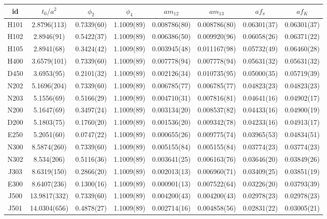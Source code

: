 \begin{sidewaystable}
\begin{center}
    \begin{tabular}{c c c c c c c c}
id & $t_0/a^2$ & $\phi_2$ & $\phi_4$ & $am_{12}$ & $am_{13}$ & $af_{\pi}$ & $af_K$ \\
\toprule
H101 & 2.8796(113) & 0.7339(60) & 1.1009(89) & 0.008786(80) & 0.008786(80) & 0.06301(37) & 0.06301(37) \\
H102 & 2.8946(91) & 0.5422(37) & 1.1009(89) & 0.006386(50) & 0.009920(96) & 0.06058(26) & 0.06371(22) \\
H105 & 2.8941(68) & 0.3424(42) & 1.1009(89) & 0.003945(48) & 0.011167(98) & 0.05732(49) & 0.06460(28) \\
\midrule
H400 & 3.6579(101) & 0.7339(60) & 1.1009(89) & 0.007778(94) & 0.007778(94) & 0.05631(32) & 0.05631(32) \\
D450 & 3.6953(95) & 0.2101(32) & 1.1009(89) & 0.002126(34) & 0.010735(95) & 0.05000(35) & 0.05719(39) \\
\midrule
N202 & 5.1696(204) & 0.7339(60) & 1.1009(89) & 0.006785(77) & 0.006785(77) & 0.04823(23) & 0.04823(23) \\
N203 & 5.1556(69) & 0.5166(29) & 1.1009(89) & 0.004710(31) & 0.007816(81) & 0.04641(16) & 0.04902(17) \\
N200 & 5.1647(69) & 0.3497(24) & 1.1009(89) & 0.003134(20) & 0.008537(82) & 0.04433(16) & 0.04900(19) \\
D200 & 5.1803(75) & 0.1760(20) & 1.1009(89) & 0.001536(20) & 0.009342(78) & 0.04233(16) & 0.04913(17) \\
E250 & 5.2051(60) & 0.0747(22) & 1.1009(89) & 0.000655(26) & 0.009775(74) & 0.03965(53) & 0.04834(51) \\
\midrule
N300 & 8.5874(260) & 0.7339(60) & 1.1009(89) & 0.005155(84) & 0.005155(84) & 0.03774(23) & 0.03774(23) \\
N302 & 8.534(206) & 0.5116(36) & 1.1009(89) & 0.003641(25) & 0.006163(76) & 0.03646(20) & 0.03849(26) \\
J303 & 8.6319(150) & 0.2866(20) & 1.1009(89) & 0.002013(13) & 0.006960(71) & 0.03409(25) & 0.03851(19) \\
E300 & 8.6407(236) & 0.1300(16) & 1.1009(89) & 0.000901(13) & 0.007522(64) & 0.03226(20) & 0.03793(39) \\
\midrule
J500 & 13.9817(332) & 0.7339(60) & 1.1009(89) & 0.004200(43) & 0.004200(43) & 0.02978(23) & 0.02978(23) \\
J501 & 14.0304(656) & 0.4878(27) & 1.1009(89) & 0.002714(16) & 0.004858(56) & 0.02831(22) & 0.03005(21) \\

\end{tabular}
\end{center}
\end{sidewaystable}
